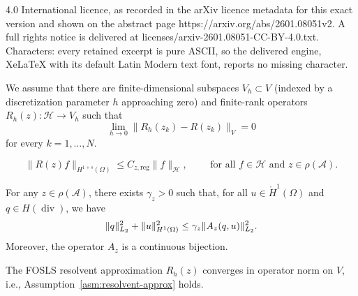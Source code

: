 \documentclass[10pt,a4paper]{amsart}
\DeclareMathOperator{\diver}{div}
\DeclarePairedDelimiter{\norm}{\lVert}{\rVert}
\newcommand{\Ac}{\mathcal{A}}
\newcommand{\Af}{{A}}
\newcommand{\Cregz}{C_{z,\text{reg}}}
\newcommand{\Hc}{\mathcal{H}}
\newcommand{\om}{\Omega}
\begin{document}
4.0 International licence, as recorded in the arXiv licence metadata for this exact version and shown on the abstract page https://arxiv.org/abs/2601.08051v2. A full rights notice is delivered at licenses/arxiv-2601.08051-CC-BY-4.0.txt. Characters: every retained excerpt is pure ASCII, so the delivered engine, XeLaTeX with its default Latin Modern text font, reports no missing character.
\begin{assumption}
  \label{asm:resolvent-approx}
  We assume that there are
  finite-dimensional subspaces $V_h \subset V$ (indexed by a
  discretization parameter $h$ approaching zero) and finite-rank
  operators $R_h(z) : \Hc \to V_h$ such that
  \begin{equation}
    \label{eq:1}
    \lim_{h \to 0} \| R_h(z_k) - R(z_k) \|_V = 0
  \end{equation}
  for every $k = 1, \dots, N.$
\end{assumption}

\begin{equation}
  \label{eq:regularity}
  \| R(z) f \|_{H^{1+s}(\om)} \le \Cregz \| f \|_{\Hc},
  \qquad \text{ for all }  f \in \Hc \text { and } z \in \rho(\Ac).
\end{equation}

\begin{lemma}
  \label{lem:Laplace-elliptic'}
  For any \(z \in \rho(\Ac)\), there exists \(\gamma_z > 0\) such that, for all
  \(u \in \mathring{H}^1(\Omega)\) and \(q \in H(\diver)\), we have
  \begin{equation}
    \label{eq:Laplace-elliptic'}
    \norm{q}_{L_2%
    }^2 +
    \norm{u}_{H^1(\Omega)
    }^2 
    \leq \gamma_z \norm{\Af_z (q, u)}_{L_2}^2.
  \end{equation}
  Moreover, the operator \(\Af_z\) is a continuous bijection.
\end{lemma}

\begin{proposition}
  The FOSLS resolvent approximation $R_h(z)$ converges in operator norm on $V$,
  i.e., Assumption~\ref{asm:resolvent-approx} holds.
\end{proposition}
\end{document}
